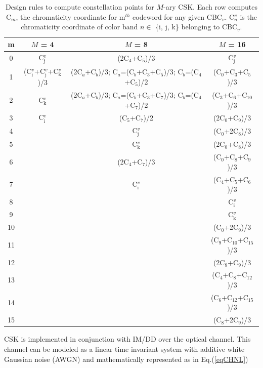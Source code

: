 \documentclass[10pt,letterpaper]{article}
\begin{document}
\begin{table}[t]
\centering
\begin{tabular}{|c|c|c|c|}
\hline
\textbf{m} & \textbf{$M$ = 4} & \textbf{$M$ = 8} & \textbf{$M$ = 16} \\
\hline
0 & C$^{v}_{\text{j}}$ & (2C$_{4}$+C$_{5}$)/3 & C$^{v}_{\text{j}}$\\
1 & (C$^{v}_{\text{i}}$+C$^{v}_{\text{j}}$+C$^{v}_{\text{k}}$)/3 & (2C$_{a}$+C$_{b}$)/3; C$_{a}$=(C$_{b}$+C$_{3}$+C$_{5}$)/3; C$_{b}$=(C$_{4}$+C$_{5}$)/2 & (C$_{0}$+C$_{3}$+C$_{5}$)/3 \\
2 & C$^{v}_{\text{k}}$ & (2C$_{a}$+C$_{b}$)/3; C$_{a}$=(C$_{b}$+C$_{3}$+C$_{7}$)/3; C$_{b}$=(C$_{4}$+C$_{7}$)/2 & (C$_{3}$+C$_{6}$+C$_{10}$)/3 \\
3 & C$^{v}_{\text{i}}$ & (C$_{5}$+C$_{7}$)/2 & (2C$_{0}$+C$_{9}$)/3 \\
\cline{2-2}
4 & & C$^{v}_{\text{j}}$ & (C$_{0}$+2C$_{8}$)/3 \\
5 & & C$^{v}_{\text{k}}$ & (2C$_{0}$+C$_{8}$)/3 \\
6 & & (2C$_{4}$+C$_{7}$)/3 & (C$_{0}$+C$_{8}$+C$_{9}$)/3 \\
7 & & C$^{v}_{\text{i}}$ & (C$_{4}$+C$_{5}$+C$_{6}$)/3 \\
\cline{3-3}
8 & & & C$^{v}_{\text{i}}$ \\
9 & & & C$^{v}_{\text{k}}$ \\
10 & & & (C$_{0}$+2C$_{9}$)/3 \\
11 & & & (C$_{9}$+C$_{10}$+C$_{15}$)/3 \\
12 & & & (2C$_{8}$+C$_{9}$)/3 \\
13 & & & (C$_{4}$+C$_{8}$+C$_{12}$)/3 \\
14 & & & (C$_{6}$+C$_{12}$+C$_{15}$)/3 \\
15 & & & (C$_{8}$+2C$_{9}$)/3 \\
\hline
\end{tabular}
\caption{Design rules to compute constellation points for $M$-ary CSK. Each row computes C$_{m}$, the chromaticity coordinate for m$^{th}$ codeword for any given CBC$_{v}$. C$^{v}_{n}$ is the chromaticity coordinate of color band $n\in$ \{i, j, k\} belonging to CBC$_{v}$.}
\label{tMCSK}
\end{table}

CSK is implemented in conjunction with IM/DD over the optical channel. This channel can be modeled as a linear time invariant system with additive white Gaussian noise (AWGN) and mathematically represented as in Eq.(\ref{eqCHNL})
\end{document}
